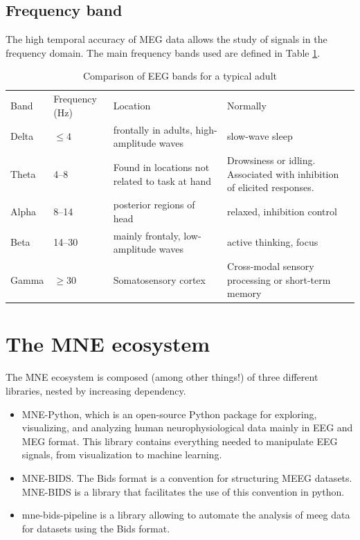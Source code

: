\subsection{Frequency band}


The high temporal accuracy of MEG data allows the study of signals in the frequency domain. The main frequency bands used are defined in Table \ref{Tab:neural_freq_band}.

\begin{table}[ht]
    \caption{Comparison of EEG bands for a typical adult}
    \centering
    \begin{tabular}{@{}| p{1.2cm}|p{2.5cm}| p{4.5cm}|p{4.5cm}| @{}}
        \hline
        Band  & Frequency (Hz) & Location                                       & Normally                                                                \\
        Delta & $\leq  4$      & frontally in adults, high-amplitude waves      & slow-wave sleep                                                         \\
        Theta & 4–8            & Found in locations not related to task at hand & Drowsiness or idling. Associated with inhibition of elicited responses. \\
        Alpha & 8–14           & posterior regions of head                      & relaxed, inhibition control                                             \\
        Beta  & 14–30          & mainly frontaly, low-amplitude waves           & active thinking, focus                                                  \\
        Gamma & $\geq 30$      & Somatosensory cortex                           & Cross-modal sensory processing or short-term memory                     \\
        \hline
    \end{tabular}
    \label{Tab:neural_freq_band}
\end{table}


\section{The MNE ecosystem}

The MNE ecosystem is composed (among other things!) of three different libraries, nested by increasing dependency.

\begin{itemize}
    \item MNE-Python, which is an open-source Python package for exploring, visualizing, and analyzing human neurophysiological data mainly in EEG and MEG format. This library contains everything needed to manipulate EEG signals, from visualization to machine learning.
    \item MNE-BIDS. The Bids format is a convention for structuring MEEG datasets. MNE-BIDS is a library that facilitates the use of this convention in python.
    \item mne-bids-pipeline is a library allowing to automate the analysis of meeg data for datasets using the Bids format.
\end{itemize}

